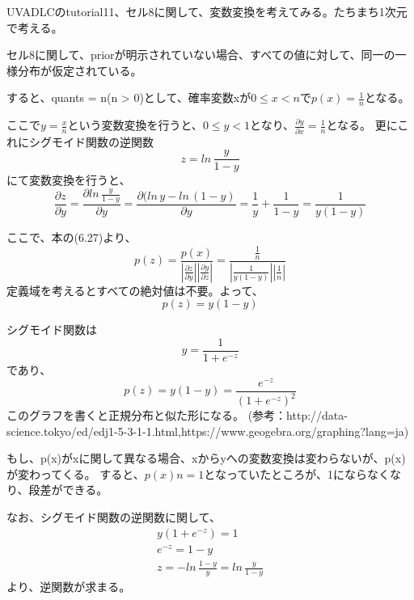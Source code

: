 ﻿\documentclass{jsarticle}
\begin{document}
UVADLCのtutorial11、セル8に関して、変数変換を考えてみる。たちまち1次元で考える。

セル8に関して、priorが明示されていない場合、すべての値に対して、同一の一様分布が仮定されている。

すると、quants = n(n > 0)として、確率変数xが$0 \leq x < n$で$p(x) = \frac{1}{n}$となる。

ここで$y = \frac{x}{n}$という変数変換を行うと、$0 \leq y < 1$となり、$\frac{\partial y}{\partial x} = \frac{1}{n}$となる。
更にこれにシグモイド関数の逆関数
\begin{equation}
z = ln \, \frac{y}{1-y}
\end{equation}
にて変数変換を行うと、
\begin{equation}
\frac{\partial z}{\partial y} = \frac{\partial ln \, \frac{y}{1-y}}{\partial y} = \frac{\partial (ln \, y - ln \, (1-y)}{\partial y}
= \frac{1}{y} + \frac{1}{1-y} = \frac{1}{y(1-y)}
\end{equation}

ここで、本の(6.27)より、
\begin{equation}
p(z) = \frac{p(x)}{|\frac{\partial z}{\partial y}||\frac{\partial y}{\partial z}|} = \frac{\frac{1}{n}}{|\frac{1}{y(1-y)}||\frac{1}{n}|}
\end{equation}
定義域を考えるとすべての絶対値は不要。よって、
\begin{equation}
p(z) = y(1-y)
\end{equation}

シグモイド関数は
\begin{equation}
y = \frac{1}{1 + e^{-z}}
\end{equation}
であり、
\begin{equation}
p(z) = y(1-y) = \frac{e^{-z}}{(1 + e^{-z})^2}
\end{equation}
このグラフを書くと正規分布と似た形になる。
(参考：http://data-science.tokyo/ed/edj1-5-3-1-1.html,https://www.geogebra.org/graphing?lang=ja)

もし、p(x)がxに関して異なる場合、xからyへの変数変換は変わらないが、p(x)が変わってくる。
すると、$p(x)n = 1$となっていたところが、1にならなくなり、段差ができる。

なお、シグモイド関数の逆関数に関して、
\begin{equation}
\begin{split}
y(1 + e^{-z}) = 1\\
e^{-z} = 1 - y\\
z = - ln \, \frac{1-y}{y} =  ln \, \frac{y}{1-y}
\end{split}
\end{equation}
より、逆関数が求まる。
\end{document}
